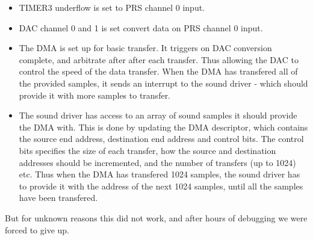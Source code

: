 \begin{itemize}
	\item TIMER3 underflow is set to PRS channel 0 input.
	\item DAC channel 0 and 1 is set convert data on PRS channel 0 input.
	\item The DMA is set up for basic transfer. It triggers on DAC conversion complete, and arbitrate after after each transfer. Thus allowing the DAC to control the speed of the data transfer. When the DMA has transfered all of the provided samples, it sends an interrupt to the sound driver - which should provide it with more samples to transfer.
	\item The sound driver has access to an array of sound samples it should provide the DMA with. This is done by updating the DMA descriptor, which contains the source end address, destination end address and control bits. The control bits specifies the size of each transfer, how the source and destination addresses should be incremented, and the number of transfers (up to 1024) etc. Thus when the DMA has transfered 1024 samples, the sound driver has to provide it with the address of the next 1024 samples, until all the samples have been transfered.  
\end{itemize}

But for unknown reasons this did not work, and after hours of debugging we were forced to give up. 






